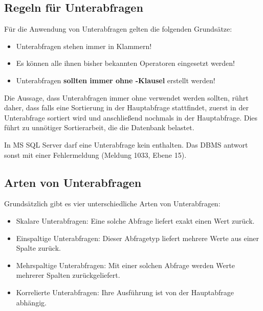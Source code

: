       \subsection{Regeln f\"ur Unterabfragen}
        F\"ur die Anwendung von Unterabfragen gelten die folgenden Grunds\"atze:
        \begin{itemize}
          \item Unterabfragen stehen immer in Klammern!
          \item Es k\"onnen alle ihnen bisher bekannten Operatoren eingesetzt werden!
          \item Unterabfragen \textbf{sollten immer ohne \ORDERBY-Klausel} erstellt werden!
        \end{itemize}
        Die Aussage, dass Unterabfragen immer ohne \ORDERBY{} verwendet werden sollten, r\"uhrt daher, dass falls eine Sortierung in der Hauptabfrage stattfindet, zuerst in der Unterabfrage sortiert wird und anschlie\ss end nochmals in der Hauptabfrage. Dies f\"uhrt zu unn\"otiger Sortierarbeit, die die Datenbank belastet.
        \begin{merke}
          In MS SQL Server darf eine Unterabfrage kein \ORDERBY{} enthalten. Das DBMS antwort sonst mit einer Fehlermeldung (Meldung 1033, Ebene 15).
        \end{merke}
      \subsection{Arten von Unterabfragen}
        Grunds\"atzlich gibt es vier unterschiedliche Arten von Unterabfragen:
        \begin{itemize}
          \item Skalare Unterabfragen: Eine solche Abfrage liefert exakt einen Wert zur\"uck.
          \item Einspaltige Unterabfragen: Dieser Abfragetyp liefert mehrere Werte aus einer Spalte zur\"uck.
          \item Mehrspaltige Unterabfragen: Mit einer solchen Abfrage werden Werte mehrerer Spalten zur\"uckgeliefert.
          \item Korrelierte Unterabfragen: Ihre Ausf\"uhrung ist von der Hauptabfrage abh\"angig.
        \end{itemize}
\clearpage
